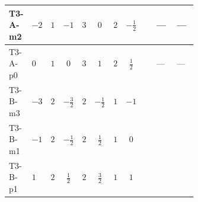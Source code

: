 \documentclass[8pt]{article}
\begin{document}
\begin{landscape}
\begin{longtable}{@{}llcccccc >{\raggedright\arraybackslash}p{0.21\linewidth} >{\raggedright\arraybackslash}p{0.21\linewidth} >{\raggedright\arraybackslash}p{0.21\linewidth}@{}}
\midrule
T3-A-m2 & $-2$ & $1$ & $-1$ & $3$ & $0$ & $2$ & $-\frac{1}{2}$ & \scriptsize\adjustbox{max width=\linewidth}{$\begin{gathered} +4 {\lambda_{HS_1}^{(1)}} {\lambda_{HS_2}^{(1)}}\end{gathered}$} & --- & --- \\
\midrule
T3-A-p0 & $0$ & $1$ & $0$ & $3$ & $1$ & $2$ & $\frac{1}{2}$ & \scriptsize\adjustbox{max width=\linewidth}{$\begin{gathered} +4 {\lambda_{HS_1}^{(1)}} {\lambda_{HS_2}^{(1)}}\end{gathered}$} & --- & --- \\
\midrule
T3-B-m3 & $-3$ & $2$ & $-\frac{3}{2}$ & $2$ & $-\frac{1}{2}$ & $1$ & $-1$ & \scriptsize\adjustbox{max width=\linewidth}{$\begin{gathered} +4 {\lambda_{HS_1}^{(1)}} {\lambda_{HS_2}^{(1)}}\end{gathered}$} & \scriptsize\adjustbox{max width=\linewidth}{$\begin{gathered} {\lambda_{12}^{(1)}} (2 T_{\nu}^{(1)}+2 T_{\nu}^{(2)})\end{gathered}$} & \scriptsize\adjustbox{max width=\linewidth}{$\begin{gathered} +\frac{9 {g_2}^4}{4}\end{gathered}$} \\
\midrule
T3-B-m1 & $-1$ & $2$ & $-\frac{1}{2}$ & $2$ & $\frac{1}{2}$ & $1$ & $0$ & \scriptsize\adjustbox{max width=\linewidth}{$\begin{gathered} +4 {\lambda_{HS_1}^{(1)}} {\lambda_{HS_2}^{(1)}}\end{gathered}$} & \scriptsize\adjustbox{max width=\linewidth}{$\begin{gathered} {\lambda_{12}^{(1)}} (2 T_{\nu}^{(1)}+2 T_{\nu}^{(2)})\end{gathered}$} & \scriptsize\adjustbox{max width=\linewidth}{$\begin{gathered} +\frac{9 {g_2}^4}{4}\end{gathered}$} \\
\midrule
T3-B-p1 & $1$ & $2$ & $\frac{1}{2}$ & $2$ & $\frac{3}{2}$ & $1$ & $1$ & \scriptsize\adjustbox{max width=\linewidth}{$\begin{gathered} +4 {\lambda_{HS_1}^{(1)}} {\lambda_{HS_2}^{(1)}}\end{gathered}$} & \scriptsize\adjustbox{max width=\linewidth}{$\begin{gathered} {\lambda_{12}^{(1)}} (2 T_{\nu}^{(1)}+2 T_{\nu}^{(2)})\end{gathered}$} & \scriptsize\adjustbox{max width=\linewidth}{$\begin{gathered} +\frac{9 {g_2}^4}{4}\end{gathered}$} \\

\end{longtable}
\end{landscape}
\end{document}
